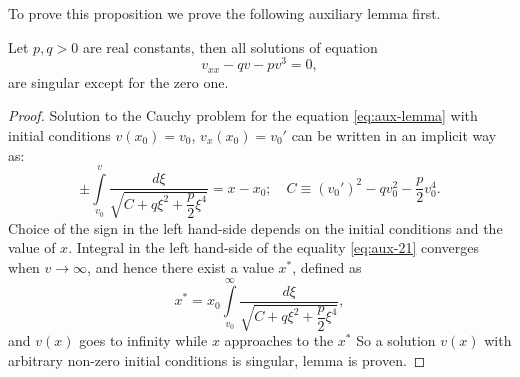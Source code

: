 To prove this proposition we prove the following auxiliary lemma first.
\begin{lemma}
	Let $p, q > 0$ are real constants, then all solutions of equation
	\begin{equation}
		v_{xx} - q v - p v^3 = 0,
		\label{eq:aux-lemma}
	\end{equation}
	are singular except for the zero one.
\end{lemma}
\begin{proof}
	Solution to the Cauchy problem for the equation \eqref{eq:aux-lemma} with initial conditions $v(x_0) = v_0$, $v_x(x_0) = v_0'$ can be written in an implicit way as:
	\begin{equation}
		\pm \int \limits_{v_0}^{v} \dfrac{d\xi}{\sqrt{C + q \xi^2 + \dfrac{p}{2} \xi^4}} = x - x_0;	\quad C \equiv (v_0')^2 - q v_0^2 - \dfrac{p}{2} v_0^4.
		\label{eq:aux-21}
	\end{equation}
	Choice of the sign in the left hand-side depends on the initial conditions and the value of $x$.
	Integral in the left hand-side of the equality \eqref{eq:aux-21} converges when $v \to \infty$, and hence there exist a value $x^*$, defined as
	\begin{equation}
		x^* = x_0 \int \limits_{v_0}^{\infty} \dfrac{d\xi}{\sqrt{C + q \xi^2 + \dfrac{p}{2} \xi^4}},
	\end{equation}
	and $v(x)$ goes to infinity while $x$ approaches to the $x^*$ 
	So a solution $v(x)$ with arbitrary non-zero initial conditions is singular, lemma is proven.
\end{proof}


